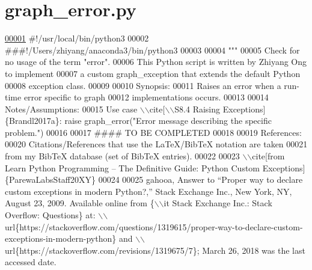 \hypertarget{graph__error_8py_source}{}\section{graph\+\_\+error.\+py}
\label{graph__error_8py_source}

\begin{DoxyCode}
\hypertarget{graph__error_8py_source_l00001}{}\hyperlink{namespaceutilities_1_1custom__exceptions_1_1graph__error}{00001} \textcolor{comment}{#!/usr/local/bin/python3}
00002 \textcolor{comment}{###!/Users/zhiyang/anaconda3/bin/python3}
00003 
00004 \textcolor{stringliteral}{"""}
00005 \textcolor{stringliteral}{    Check for no usage of the term "error".}
00006 \textcolor{stringliteral}{    This Python script is written by Zhiyang Ong to implement}
00007 \textcolor{stringliteral}{        a custom graph\_exception that extends the default Python}
00008 \textcolor{stringliteral}{        exception class.}
00009 \textcolor{stringliteral}{}
00010 \textcolor{stringliteral}{    Synopsis:}
00011 \textcolor{stringliteral}{    Raises an error when a run-time error specific to graph}
00012 \textcolor{stringliteral}{        implementations occurs.}
00013 \textcolor{stringliteral}{}
00014 \textcolor{stringliteral}{    Notes/Assumptions:}
00015 \textcolor{stringliteral}{    Use case \(\backslash\)\(\backslash\)cite[\(\backslash\)\(\backslash\)S8.4 Raising Exceptions]\{Brandl2017a\}: raise graph\_error("Error message describing
       the specific problem.")}
00016 \textcolor{stringliteral}{}
00017 \textcolor{stringliteral}{    #### TO BE COMPLETED}
00018 \textcolor{stringliteral}{}
00019 \textcolor{stringliteral}{    References:}
00020 \textcolor{stringliteral}{    Citations/References that use the LaTeX/BibTeX notation are taken}
00021 \textcolor{stringliteral}{        from my BibTeX database (set of BibTeX entries).}
00022 \textcolor{stringliteral}{}
00023 \textcolor{stringliteral}{    \(\backslash\)\(\backslash\)cite[from Learn Python Programming -- The Definitive Guide: Python Custom
       Exceptions]\{ParewaLabsStaff20XY\}}
00024 \textcolor{stringliteral}{}
00025 \textcolor{stringliteral}{    gahooa, Answer to ``Proper way to declare custom exceptions in modern Python?,'' Stack Exchange Inc.,
       New York, NY, August 23, 2009. Available online from \{\(\backslash\)\(\backslash\)it Stack Exchange Inc.: Stack Overflow: Questions\}
       at:
       \(\backslash\)\(\backslash\)url\{https://stackoverflow.com/questions/1319615/proper-way-to-declare-custom-exceptions-in-modern-python\} and \(\backslash\)\(\backslash\)url\{https://stackoverflow.com/revisions/1319675/7\}; March 26, 2018 was the last accessed date.}

\end{DoxyCode}
